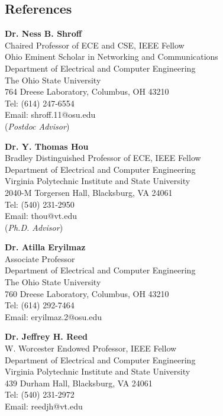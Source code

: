 \documentclass[overlapped,line,letterpaper]{res1}
\begin{document}
\begin{resume}
\section{\bf \large References}
\vspace{.1in}
{\bf Dr. Ness B. Shroff} \\
Chaired Professor of ECE and CSE, IEEE Fellow \\
Ohio Eminent Scholar in Networking and Communications \\
Department of Electrical and Computer Engineering \\
The Ohio State University \\
764 Dreese Laboratory, Columbus, OH 43210\\
Tel: (614) 247-6554 \\
Email: shroff.11@osu.edu\\
({\em Postdoc Advisor}) 


\medskip
{\bf Dr. Y. Thomas Hou}                  \\
Bradley Distinguished Professor of ECE, IEEE Fellow \\
Department of Electrical and Computer Engineering \\
Virginia Polytechnic Institute and State University    \\
2040-M Torgersen Hall, Blacksburg, VA 24061  \\
Tel: (540) 231-2950 \\
Email: thou@vt.edu \\
({\em Ph.D. Advisor})


\medskip
{\bf Dr. Atilla Eryilmaz} \\ %
Associate Professor  \\
Department of Electrical and Computer Engineering \\
The Ohio State University \\
760 Dreese Laboratory, Columbus, OH 43210 \\
Tel: (614) 292-7464 \\
Email: eryilmaz.2@osu.edu



\medskip
{\bf Dr. Jeffrey H. Reed} \\ %
W. Worcester Endowed Professor, IEEE Fellow  \\
Department of Electrical and Computer Engineering \\
Virginia Polytechnic Institute and State University \\
439 Durham Hall, Blacksburg, VA 24061 \\
Tel: (540) 231-2972 \\
Email: reedjh@vt.edu



\end{resume}
\end{document}
